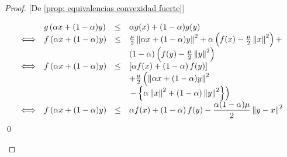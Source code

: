 \begin{proof}{[De \ref{prop: equivalencias convexidad fuerte}]}
\begin{enumerate}
		\begin{equation*}
			\begin{array}{llll}
				& g \left(\alpha x + (1-\alpha)y\right) & \leq & \alpha g(x) + (1-\alpha)g(y) \\
				\Longleftrightarrow & f\left(\alpha x + (1-\alpha)y\right) & \leq &  \frac{\mu}{2} \left\lVert\alpha x + (1-\alpha)y\right\rVert^2 + \alpha \left(f(x) - \frac{\mu}{2} \left\lVert x\right\rVert^2\right) + \\ &&& \left(1-\alpha\right) \left(f(y) - \frac{\mu}{2} \left\lVert y\right\rVert^2\right) \\
				\Longleftrightarrow & f\left(\alpha x + (1-\alpha)y\right) & \leq & \left[\alpha f(x) + \left(1 - \alpha\right)f(y) \right] \\ &&& + \frac{\mu}{2} \left(\left\lVert\alpha x + (1-\alpha)y\right\rVert^2 \right. \\ &&&  \left. - \left\lbrace \alpha\left\lVert x\right\rVert^2 + (1-\alpha) \left\lVert y\right\rVert^2 \right\rbrace \right) \\
				\Longleftrightarrow & f\left(\alpha x + (1-\alpha)y\right) & \leq & \alpha f(x) + \left(1 - \alpha\right)f(y) - \dfrac{\alpha (1-\alpha) \mu}{2} \left\lVert y-x\right\rVert^2
			\end{array}
		\end{equation*}
		\qed
	\end{enumerate}
\end{proof}

